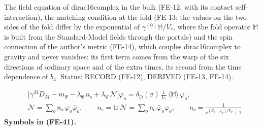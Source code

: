 \documentclass[
  10pt,
]{article}
\begin{document}
The field equation of dirac16complex in the bulk (FE-12, with its
contact self-interaction), the matching condition at the fold (FE-13:
the values on the two sides of the fold differ by the exponential of
\(\gamma^{(0)}\mathbb{M}/V_*\), where the fold operator \(\mathbb{M}\)
is built from the Standard-Model fields through the portals) and the
spin connection of the author's metric (FE-14), which couples
dirac16complex to gravity and never vanishes: its first term comes from
the warp of the six directions of ordinary space and of the extra times,
its second from the time dependence of \(b_4\). Status: RECORD (FE-12),
DERIVED (FE-13, FE-14).

\[
\begin{aligned}
&\big[\gamma^MD_M - m_\Psi - \lambda_\Psi\,n_{\mathrm{s}} + \lambda_\Psi\,\mathcal{N}\big]\varphi_o
 = \delta_{\mathrm{D}}(\sigma)\,\frac{1}{V_*}\,\langle\mathbb{M}\rangle\,\varphi_o,\\
&\mathcal{N} = \sum_o\mathsf{n}_o\,\varphi_o\bar\varphi_o,\qquad n_{\mathrm{s}} = \mathrm{tr}\,\mathcal{N} = \sum_o\mathsf{n}_o\,\bar\varphi_o\varphi_o,\qquad
 \mathsf{n}_o = \frac{1}{\mathrm{e}^{(E_o - \mu_\Psi)/\mathsf{T}_\Psi} + 1}
\end{aligned} \tag{FE-41}
\] \textbf{Symbols in (FE-41).}
\end{document}
